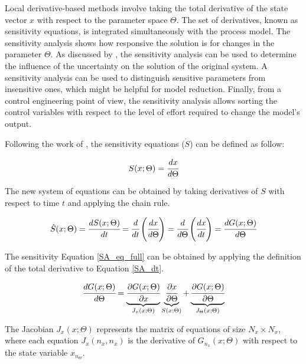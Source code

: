 \documentclass[../Article_Sensitivity_Analsysis.tex]{subfiles}
\begin{document}
	
	Local derivative-based methods involve taking the total derivative of the state vector $x$ with respect to the parameter space $\Theta$. The set of derivatives, known as sensitivity equations, is integrated simultaneously with the process model. The sensitivity analysis shows how responsive the solution is for changes in the parameter $\Theta$. As discussed by \citet{Dickinson1976}, the sensitivity analysis can be used to determine the influence of the uncertainty on the solution of the original system. A sensitivity analysis can be used to distinguish sensitive parameters from insensitive ones, which might be helpful for model reduction. Finally, from a control engineering point of view, the sensitivity analysis allows sorting the control variables with respect to the level of effort required to change the model's output.
	
	Following the work of \citet{Maly1996}, the sensitivity equations (${\dot{S}}$) can be defined as follow:
	
	{\footnotesize
		\begin{equation}
			\label{SA_def}
			S(x;\Theta) = \cfrac{dx}{d\Theta}
	   \end{equation} }
	
	The new system of equations can be obtained by taking derivatives of $S$ with respect to time $t$ and applying the chain rule.
	
	{\footnotesize
		\begin{equation} \label{SA_dt} 
			{\dot{S}}(x;\Theta)  = \cfrac{dS(x;\Theta)}{d t} = \cfrac{d}{d t} \left( \cfrac{dx}{d\Theta} \right) = \cfrac{d }{d\Theta} \left( \cfrac{dx}{d t} \right) = \cfrac{d {G}(x;\Theta)}{d\Theta} 
	\end{equation} }
	
	The sensitivity Equation \ref{SA_eq_full} can be obtained by applying the definition of the total derivative to Equation \ref{SA_dt}.
	
	{\footnotesize
		\begin{equation} \label{SA_eq_full}
			\cfrac{d G(x;\Theta)}{d \Theta} = \underbrace{ \cfrac{\partial {G}(x;\Theta)}{\partial x} }_{{J_x}(x;\Theta)} \underbrace{\cfrac{\partial x}{\partial \Theta} }_{S(x;\Theta)} + \underbrace{ \cfrac{\partial {G}(x;\Theta)}{\partial \Theta} }_{{J_\Theta}(x;\Theta)}
	  \end{equation} }
	
	The Jacobian ${J_x}(x;\Theta)$ represents the matrix of equations of size $N_x \times N_x$, where each equation ${J_x}(n_x,n_x)$ is the derivative of ${G}_{n_x}(x;\Theta)$ with respect to the state variable $x_{n_\Theta}$.
	
\end{document}
